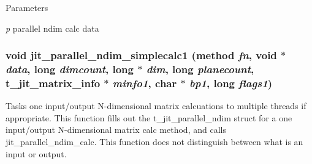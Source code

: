 \begin{DoxyParams}{Parameters}
\item[{\em p}]parallel ndim calc data \end{DoxyParams}
\hypertarget{group__parallelutilmod_ga86f0d53ddcde42a844507338fedd829e}{
\subsubsection[{jit\_\-parallel\_\-ndim\_\-simplecalc1}]{\setlength{\rightskip}{0pt plus 5cm}void jit\_\-parallel\_\-ndim\_\-simplecalc1 ({\bf method} {\em fn}, \/  void $\ast$ {\em data}, \/  long {\em dimcount}, \/  long $\ast$ {\em dim}, \/  long {\em planecount}, \/  {\bf t\_\-jit\_\-matrix\_\-info} $\ast$ {\em minfo1}, \/  char $\ast$ {\em bp1}, \/  long {\em flags1})}}
\label{group__parallelutilmod_ga86f0d53ddcde42a844507338fedd829e}


Tasks one input/output N-\/dimensional matrix calcuations to multiple threads if appropriate. This function fills out the t\_\-jit\_\-parallel\_\-ndim struct for a one input/output N-\/dimensional matrix calc method, and calls jit\_\-parallel\_\-ndim\_\-calc. This function does not distinguish between what is an input or output.


